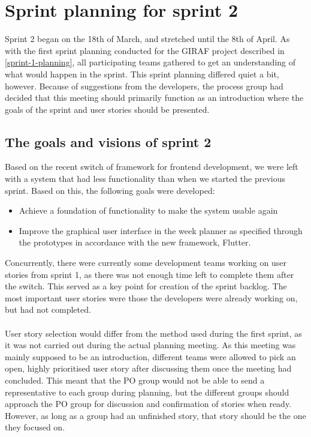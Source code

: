 \section{Sprint planning for sprint 2}
Sprint 2 began on the 18th of March, and stretched until the 8th of April.
As with the first sprint planning conducted for the GIRAF project described in \autoref{sprint-1-planning}, all participating teams gathered to get an understanding of what would happen in the sprint.
This sprint planning differed quiet a bit, however.
Because of suggestions from the developers, the process group had decided that this meeting should primarily function as an introduction where the goals of the sprint and user stories should be presented.

\subsection{The goals and visions of sprint 2}
Based on the recent switch of framework for frontend development, we were left with a system that had less functionality than when we started the previous sprint.
Based on this, the following goals were developed:
\begin{itemize}
    \item Achieve a foundation of functionality to make the system usable again
    \item Improve the graphical user interface in the week planner as specified through the prototypes in accordance with the new framework, Flutter.
\end{itemize}
Concurrently, there were currently some development teams working on user stories from sprint 1, as there was not enough time left to complete them after the switch.
This served as a key point for creation of the sprint backlog.
The most important user stories were those the developers were already working on, but had not completed. 
\\\\
User story selection would differ from the method used during the first sprint, as it was not carried out during the actual planning meeting.
As this meeting was mainly supposed to be an introduction, different teams were allowed to pick an open, highly prioritised user story after discussing them once the meeting had concluded.
This meant that the PO group would not be able to send a representative to each group during planning, but the different groups should approach the PO group for discussion and confirmation of stories when ready.
However, as long as a group had an unfinished story, that story should be the one they focused on.
